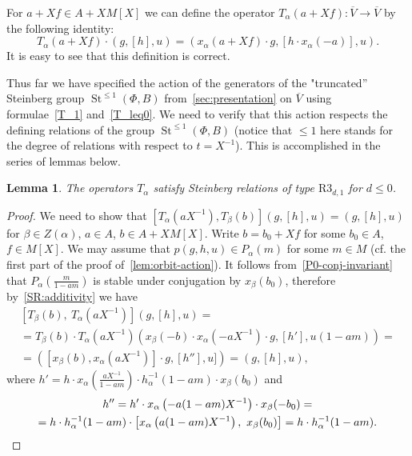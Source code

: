 \documentclass[oneside, 8pt]{amsart}
\newtheorem{lemma}{Lemma}
\theoremstyle{remark}
\theoremstyle{definition}
\numberwithin{lemma}{section}
\numberwithin{prop}{section}
\numberwithin{corollary}{section}
\numberwithin{externaltheorem}{section}
\DeclareMathOperator{\St}{St}
\numberwithin{equation}{section}
\begin{document}
For $a + Xf \in A + XM[X]$ we can define the operator $T_\alpha(a + Xf) \colon \overline{V} \to \overline{V}$ by the following identity:
\begin{equation} \label{T_leq0} T_\alpha(a + Xf) \cdot (g, [h], u) = (x_\alpha(a + Xf) \cdot g, [h \cdot x_{\alpha}(-a)], u).  \end{equation}
It is easy to see that this definition is correct.

Thus far we have specified the action of the generators of the "truncated'' Steinberg group $\St^{\leq 1}(\Phi, B)$ from~\cref{sec:presentation} on $\overline{V}$ using formulae~\eqref{T_1} and~\eqref{T_leq0}. We need to verify that this action respects the defining relations of the group $\St^{\leq 1}(\Phi, B)$ (notice that $\leq 1$ here stands for the degree of relations with respect to $t = X^{-1}$). This is accomplished in the series of lemmas below.

\begin{lemma} \label{R3_leq0_1} The operators $T_\alpha$ satisfy Steinberg relations of type $\mathrm{R3}_{d, 1}$ for $d\leq 0$. \end{lemma}
\begin{proof} We need to show that $[T_\alpha(aX^{-1}), T_\beta(b)](g, [h], u) = (g, [h], u)$ for $\beta\in Z(\alpha)$, $a\in A$, $b\in A + XM[X]$.
Write $b = b_0 + Xf$ for some $b_0 \in A$, $f \in M[X]$.
We may assume that $p(g, h, u) \in P_\alpha(m)$ for some $m \in M$  (cf. the first part of the proof of~\cref{lem:orbit-action}).
It follows from~\cref{P0-conj-invariant} that $P_\alpha\left(\tfrac{m}{1-am}\right)$ is stable under conjugation by $x_\beta(b_0)$, therefore by~\cref{SR:additivity} we have
\begin{multline} \nonumber
  \left[T_\beta(b),\ T_\alpha(aX^{-1}) \right] (g, [h], u) = \\
  = T_\beta(b) \cdot T_\alpha(aX^{-1}) \left(x_\beta(-b) \cdot x_\alpha(-aX^{-1}) \cdot g, [h'], u(1-am)\right) = \\ = \left( [x_\beta(b), x_{\alpha}(aX^{-1})] \cdot g, [h''], u] \right) = \left(g, [h], u\right), \end{multline}
where $h' = h \cdot x_{\alpha}\left(\tfrac{aX^{-1}}{1-am}\right) \cdot h^{-1}_\alpha(1-am) \cdot x_\beta(b_0)$ and
\begin{multline} \nonumber
 h'' = h' \cdot x_{\alpha}\left(-a(1-am)X^{-1}\right) \cdot x_{\beta}(-b_0) = \\
 = h \cdot h_\alpha^{-1}(1-am) \cdot \left[x_\alpha\left(a(1-am)X^{-1}\right),\ x_\beta(b_0)\right] = h \cdot h_\alpha^{-1}(1-am). \qedhere \end{multline}
\end{proof}
\end{document}

